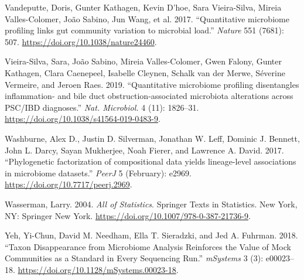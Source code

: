 \documentclass[
]{article}
\newlength{\cslhangindent}
\newlength{\cslentryspacingunit} %
\newenvironment{CSLReferences}[2] %
 {%
  \setlength{\parindent}{0pt}
  \ifodd #1
  \let\oldpar\par
  \def\par{\hangindent=\cslhangindent\oldpar}
  \fi
  \setlength{\parskip}{#2\cslentryspacingunit}
 }%
 {}
\theoremstyle{definition}
\theoremstyle{definition}
\theoremstyle{definition}
\theoremstyle{definition}
\theoremstyle{remark}
\begin{document}
\begin{CSLReferences}{1}{0}
\leavevmode{}%
Vandeputte, Doris, Gunter Kathagen, Kevin D'hoe, Sara Vieira-Silva, Mireia Valles-Colomer, João Sabino, Jun Wang, et al. 2017. {``{Quantitative microbiome profiling links gut community variation to microbial load}.''} \emph{Nature} 551 (7681): 507. \url{https://doi.org/10.1038/nature24460}.

\leavevmode{}%
Vieira-Silva, Sara, João Sabino, Mireia Valles-Colomer, Gwen Falony, Gunter Kathagen, Clara Caenepeel, Isabelle Cleynen, Schalk van der Merwe, Séverine Vermeire, and Jeroen Raes. 2019. {``{Quantitative microbiome profiling disentangles inflammation- and bile duct obstruction-associated microbiota alterations across PSC/IBD diagnoses}.''} \emph{Nat. Microbiol.} 4 (11): 1826--31. \url{https://doi.org/10.1038/s41564-019-0483-9}.

\leavevmode{}%
Washburne, Alex D., Justin D. Silverman, Jonathan W. Leff, Dominic J. Bennett, John L. Darcy, Sayan Mukherjee, Noah Fierer, and Lawrence A. David. 2017. {``{Phylogenetic factorization of compositional data yields lineage-level associations in microbiome datasets}.''} \emph{PeerJ} 5 (February): e2969. \url{https://doi.org/10.7717/peerj.2969}.

\leavevmode{}%
Wasserman, Larry. 2004. \emph{{All of Statistics}}. Springer Texts in Statistics. New York, NY: Springer New York. \url{https://doi.org/10.1007/978-0-387-21736-9}.

\leavevmode{}%
Yeh, Yi-Chun, David M. Needham, Ella T. Sieradzki, and Jed A. Fuhrman. 2018. {``{Taxon Disappearance from Microbiome Analysis Reinforces the Value of Mock Communities as a Standard in Every Sequencing Run}.''} \emph{mSystems} 3 (3): e00023--18. \url{https://doi.org/10.1128/mSystems.00023-18}.

\end{CSLReferences}
\end{document}
